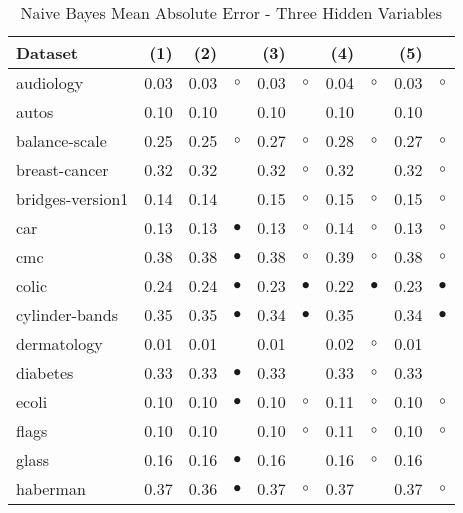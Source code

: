 \newpage
{\centering \footnotesize \begin{longtable}{lrr@{\hspace{0.1cm}}cr@{\hspace{0.1cm}}cr@{\hspace{0.1cm}}cr@{\hspace{0.1cm}}c}
\caption{\label{nbmae3}Naive Bayes Mean Absolute Error - Three Hidden Variables}
\\
\hline
Dataset & (1)& (2) & & (3) & & (4) & & (5) & \\
\hline
audiology & 0.03 & 0.03 &   $\circ$ & 0.03 &    $\circ$ & 0.04 &   $\circ$ & 0.03 &    $\circ$\\
autos & 0.10 & 0.10 &           & 0.10 &            & 0.10 &           & 0.10 &           \\
balance-scale & 0.25 & 0.25 &   $\circ$ & 0.27 &    $\circ$ & 0.28 &   $\circ$ & 0.27 &    $\circ$\\
breast-cancer & 0.32 & 0.32 &           & 0.32 &    $\circ$ & 0.32 &           & 0.32 &    $\circ$\\
bridges-version1 & 0.14 & 0.14 &           & 0.15 &    $\circ$ & 0.15 &   $\circ$ & 0.15 &    $\circ$\\
car & 0.13 & 0.13 & $\bullet$ & 0.13 &    $\circ$ & 0.14 &   $\circ$ & 0.13 &    $\circ$\\
cmc & 0.38 & 0.38 & $\bullet$ & 0.38 &    $\circ$ & 0.39 &   $\circ$ & 0.38 &    $\circ$\\
colic & 0.24 & 0.24 & $\bullet$ & 0.23 &  $\bullet$ & 0.22 & $\bullet$ & 0.23 &  $\bullet$\\
cylinder-bands & 0.35 & 0.35 & $\bullet$ & 0.34 &  $\bullet$ & 0.35 &           & 0.34 &  $\bullet$\\
dermatology & 0.01 & 0.01 &           & 0.01 &            & 0.02 &   $\circ$ & 0.01 &           \\
diabetes & 0.33 & 0.33 & $\bullet$ & 0.33 &            & 0.33 &   $\circ$ & 0.33 &           \\
ecoli & 0.10 & 0.10 & $\bullet$ & 0.10 &    $\circ$ & 0.11 &   $\circ$ & 0.10 &    $\circ$\\
flags & 0.10 & 0.10 &           & 0.10 &    $\circ$ & 0.11 &   $\circ$ & 0.10 &    $\circ$\\
glass & 0.16 & 0.16 & $\bullet$ & 0.16 &            & 0.16 &   $\circ$ & 0.16 &           \\
haberman & 0.37 & 0.36 & $\bullet$ & 0.37 &    $\circ$ & 0.37 &           & 0.37 &    $\circ$\\

\end{longtable}}

